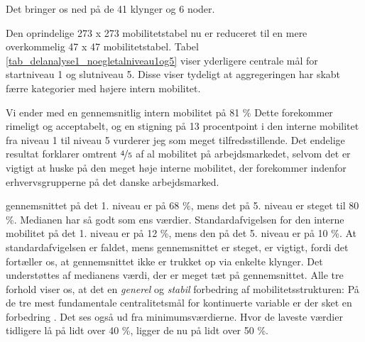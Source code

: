 Det bringer os ned på de 41 klynger og 6 noder.


%
%






Den oprindelige 273 x 273 mobilitetstabel nu er reduceret til en mere overkommelig 47 x 47 mobilitetstabel. Tabel \ref{tab_delanalyse1_noegletalniveau1og5} viser yderligere centrale mål for startniveau 1 og slutniveau 5. Disse viser tydeligt at aggregeringen har skabt færre kategorier med højere intern mobilitet. 

Vi ender med en gennemsnitlig intern mobilitet på 81 \% Dette forekommer rimeligt og acceptabelt, og en stigning på 13 procentpoint i den interne mobilitet fra niveau 1 til niveau 5 vurderer jeg som meget tilfredsstillende. Det endelige resultat forklarer omtrent $\nicefrac{4}{5}$ af al mobilitet på arbejdsmarkedet, selvom det er vigtigt at huske på den meget høje interne mobilitet, der forekommer indenfor erhvervsgrupperne på det danske arbejdsmarked. 

%
      
%

gennemsnittet på det 1. niveau er på 68 \%, mens det på 5. niveau er steget til 80 \%. Medianen har så godt som ens værdier. Standardafvigelsen for den interne mobilitet på det 1. niveau er på 12 \%, mens den på det 5. niveau er på 10 \%. At standardafvigelsen er faldet, mens gennemsnittet er steget, er vigtigt, fordi det fortæller os, at gennemsnittet ikke er trukket op via enkelte klynger. Det understøttes af medianens værdi, der er meget tæt på gennemsnittet. Alle tre forhold viser os, at det en \emph{generel} og \emph{stabil} forbedring af mobilitetsstrukturen: På de tre mest fundamentale centralitetsmål for kontinuerte variable er der sket en forbedring \parencite[121]{Malchow-MoellerWuertz2010}. Det ses også ud fra minimumsværdierne. Hvor de laveste værdier tidligere lå på lidt over 40 \%, ligger de nu på lidt over 50 \%.


